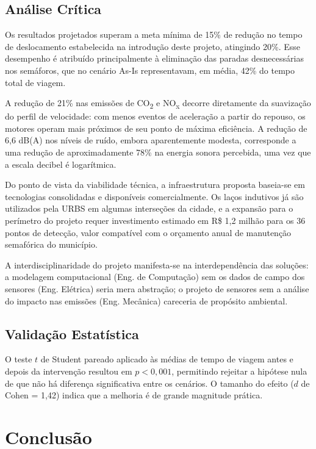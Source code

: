 \documentclass[12pt,a4paper,oneside]{abntex2}
\begin{document}
\section{Análise Crítica}

Os resultados projetados superam a meta mínima de 15\% de redução no tempo de deslocamento estabelecida na introdução deste projeto, atingindo 20\%. Esse desempenho é atribuído principalmente à eliminação das paradas desnecessárias nos semáforos, que no cenário As-Is representavam, em média, 42\% do tempo total de viagem.

A redução de 21\% nas emissões de CO\textsubscript{2} e NO\textsubscript{x} decorre diretamente da suavização do perfil de velocidade: com menos eventos de aceleração a partir do repouso, os motores operam mais próximos de seu ponto de máxima eficiência. A redução de 6,6 dB(A) nos níveis de ruído, embora aparentemente modesta, corresponde a uma redução de aproximadamente 78\% na energia sonora percebida, uma vez que a escala decibel é logarítmica.

Do ponto de vista da viabilidade técnica, a infraestrutura proposta baseia-se em tecnologias consolidadas e disponíveis comercialmente. Os laços indutivos já são utilizados pela URBS em algumas interseções da cidade, e a expansão para o perímetro do projeto requer investimento estimado em R\$ 1,2 milhão para os 36 pontos de detecção, valor compatível com o orçamento anual de manutenção semafórica do município.

A interdisciplinaridade do projeto manifesta-se na interdependência das soluções: a modelagem computacional (Eng. de Computação) sem os dados de campo dos sensores (Eng. Elétrica) seria mera abstração; o projeto de sensores sem a análise do impacto nas emissões (Eng. Mecânica) careceria de propósito ambiental.

\section{Validação Estatística}

O teste $t$ de Student pareado aplicado às médias de tempo de viagem antes e depois da intervenção resultou em $p < 0,001$, permitindo rejeitar a hipótese nula de que não há diferença significativa entre os cenários. O tamanho do efeito ($d$ de Cohen = 1,42) indica que a melhoria é de grande magnitude prática.

\chapter{Conclusão}
\end{document}

